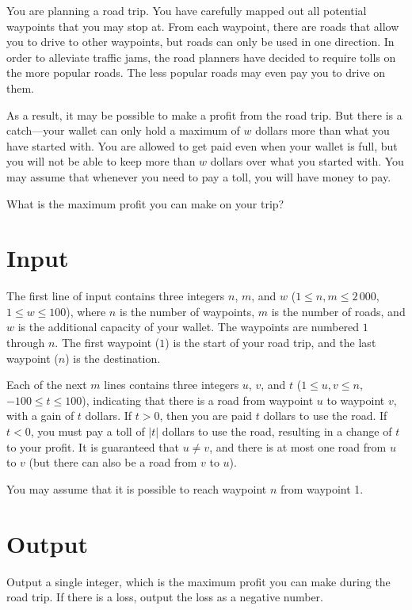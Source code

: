
You are planning a road trip.  You have carefully mapped out all
potential waypoints that you may stop at.  From each waypoint, there
are roads that allow you to drive to other waypoints, but roads can only
be used in one direction.  In order to alleviate traffic jams, the
road planners have decided to require tolls on the more popular roads.
The less popular roads may even pay you to drive on them.

As a result, it may be possible to make a profit from the road trip.
But there is a catch---your wallet can only hold a maximum of $w$
dollars more than what you have started with.  You are allowed to get
paid even when your wallet is full, but you will not be able to keep
more than $w$ dollars over what you started with.  
You may assume that whenever you need to pay a
toll, you will have money to pay.

What is the maximum profit you can make on your trip?



\section*{Input}

The first line of input contains three integers $n$, $m$, and $w$
($1 \leq n, m \leq 2\,000$, $1 \leq w \leq 100$), where $n$ is the
number of waypoints, $m$ is the number of roads, and $w$ is the additional capacity
of your wallet. The waypoints are numbered $1$ through $n$. The first waypoint ($1$) is the start of your road trip, and the last
waypoint ($n$) is the destination. 

Each of the next $m$ lines contains three integers $u$, $v$, and $t$ ($1 \leq u, v \leq n$, $-100 \leq t \leq 100$),
indicating that there is a road from waypoint $u$ to waypoint $v$,
with a gain of $t$ dollars.  If $t > 0$, then you are paid $t$ dollars
to use the road.  If $t < 0$, you must pay a toll of $|t|$ dollars to
use the road, resulting in a change of $t$ to your profit.  It is guaranteed that $u \neq v$, and there is at most
one road from $u$ to $v$ (but there can also be a road from $v$ to
$u$).

You may assume that it is possible to reach waypoint $n$ from waypoint
1.

\section*{Output}

Output a single integer, which is the maximum profit you can make during the road trip.  If there
is a loss, output the loss as a negative number.
